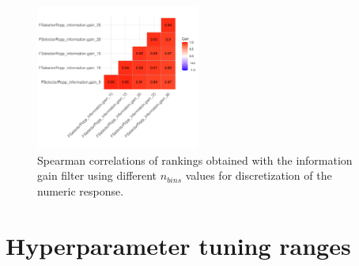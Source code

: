 \documentclass[letterpaper, peerreview, draftcls]{IEEEtran}
\begin{document}
\begin{figure} [ht]
	\begin{center}
		\includegraphics[width=0.48\textwidth] {correlation-nbins-1.pdf}
		\caption{Spearman correlations of rankings obtained with the information gain filter using different \texttt{\(n_{bins}\)} values for discretization of the numeric response.}\label{fig:correlation-nbins}
	\end{center}
\end{figure}

\pagebreak

\section{Hyperparameter tuning ranges}
\end{document}
